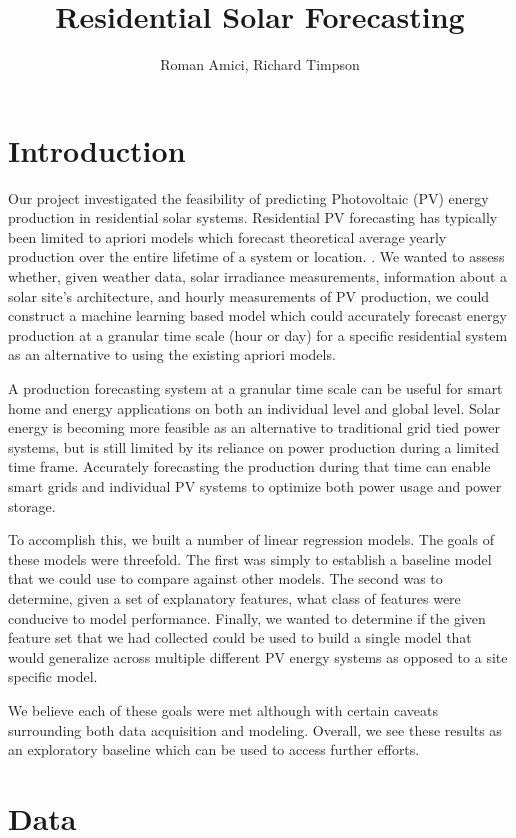 \documentclass[11pt, fullpage,letterpaper]{article}
\title{Residential Solar Forecasting}
\author{Roman Amici, Richard Timpson}
\begin{document}
\maketitle

\section{Introduction}

Our project investigated the feasibility of predicting Photovoltaic (PV) energy production in residential solar systems. Residential PV forecasting has typically been limited to apriori models which forecast theoretical average yearly production over the entire lifetime of a system or location. \cite{SAM}. We wanted to assess whether, given weather data, solar irradiance measurements, information about a solar site’s architecture, and hourly measurements of PV production, we could construct a machine learning based model which could accurately forecast energy production at a granular time scale (hour or day) for a specific residential system as an alternative to using the existing apriori models.

A production forecasting system at a granular time scale can be useful for smart home and energy applications on both an individual level and global level. Solar energy is becoming more feasible as an alternative to traditional grid tied power systems, but is still limited by its reliance on power production during a limited time frame. Accurately forecasting the production during that time can enable smart grids and individual PV systems to optimize both power usage and power storage. 

To accomplish this, we built a number of linear regression models. The goals of these models were threefold. The first was simply to establish a baseline model that we could use to compare against other models. The second was to determine, given a set of explanatory features, what class of features were conducive to model performance. Finally, we wanted to determine if the given feature set that we had collected could be used to build a single model that would generalize across multiple different PV energy systems as opposed to a site specific model. 

We believe each of these goals were met although with certain caveats surrounding both data acquisition and modeling. Overall, we see these results as an exploratory baseline which can be used to access further efforts.

\section{Data}
\end{document}
